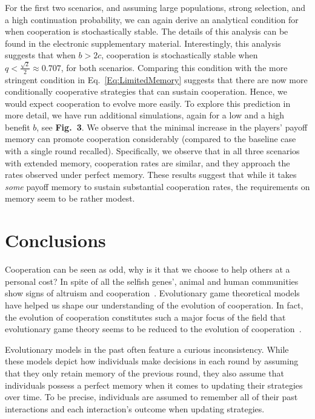 \documentclass[11pt]{article}
\def\esm{electronic supplementary material}
\newcommand{\FigHigherMemory}{{\bf Fig.~3}}
\theoremstyle{plainCl1}
\theoremstyle{plainCl2}
\begin{document}
For the first two scenarios, and assuming large populations, strong selection, and a high continuation probability, we can again derive an analytical condition for when cooperation is stochastically stable. 
The details of this analysis can be found in the \esm. 
Interestingly, this analysis suggests that when $b\!>\!2c$, cooperation is stochastically stable when $q\!<\! \frac{\sqrt{2}}{2}\approx 0.707$, for both scenarios. 
Comparing this condition with the more stringent condition in Eq.~\eqref{Eq:LimitedMemory} suggests that there are now more conditionally cooperative strategies that can sustain cooperation. 
Hence, we would expect cooperation to evolve more easily. 
To explore this prediction in more detail, we have run additional simulations, again for a low and a high benefit $b$, 
see \FigHigherMemory.
We observe that the minimal increase in the players' payoff memory can promote cooperation considerably (compared to the baseline case with a single round recalled). 
Specifically, we observe that in all three scenarios with extended memory, cooperation rates are similar, and they approach the rates observed under perfect memory. 
These results suggest that while it takes {\it some} payoff memory to sustain substantial cooperation rates, the requirements on memory seem to be rather modest. 

\section{Conclusions}\label{section:conclusions}

Cooperation can be seen as odd, why is it that we choose to help others at a
personal cost? In spite of all the selfish genes', animal and human communities
show signs of altruism and cooperation~\cite{milinski1987tit, kerr2002local,
carter2020development}. Evolutionary game theoretical models have helped us
shape our understanding of the evolution of cooperation. In fact, the evolution
of cooperation constitutes such a major focus of the field that evolutionary
game theory seems to be reduced to the evolution of
cooperation~\cite{Traulsen:PhilTrans:2022}. 

Evolutionary models in the past often feature a curious inconsistency. While
these models depict how individuals make decisions in each round by assuming
that they only retain memory of the previous round, they also assume that
individuals possess a perfect memory when it comes to updating their strategies
over time. To be precise, individuals are assumed to remember all of their past
interactions and each interaction's outcome when updating strategies.
\end{document}
